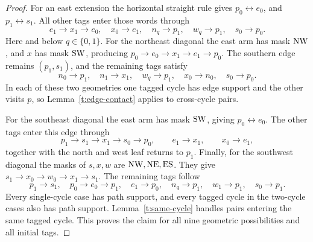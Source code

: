 \begin{proof}
For an east extension the horizontal straight rule gives
\(p_0\leftrightarrow e_0\), and \(p_1\leftrightarrow s_1\).
All other tags enter those words through
\[
e_1\to x_1\to e_0,\quad x_0\to e_1,\quad
n_q\to p_1,\quad w_q\to p_1,\quad s_0\to p_0.
\]
Here and below \(q\in\{0,1\}\). For the northeast diagonal the east arm
has mask \(\mathrm{N}\mathrm{W}\), and \(x\) has mask \(\mathrm{S}\mathrm{W}\), producing
\(p_0\to e_0\to x_1\to e_1\to p_0\). The southern edge remains
\((p_1,s_1)\), and the remaining tags satisfy
\[
n_0\to p_1,\quad n_1\to x_1,\quad w_q\to p_1,
\quad x_0\to n_0,\quad s_0\to p_0.
\]
In each of these two geometries one tagged cycle has edge support and the
other visits \(p\), so Lemma~\ref{t:edge-contact} applies to cross-cycle
pairs.

For the southeast diagonal the east arm has mask \(\mathrm{S}\mathrm{W}\), giving
\(p_0\leftrightarrow e_0\). The other tags enter this edge through
\[
p_1\to s_1\to x_1\to s_0\to p_0,
\qquad e_1\to x_1,\qquad x_0\to e_1,
\]
together with the north and west leaf returns to \(p_1\). Finally, for the
southwest diagonal the masks of \(s,x,w\) are
\(\mathrm{N}\mathrm{W},\mathrm{N}\mathrm{E},\mathrm{E}\mathrm{S}\). They give
\(s_1\to x_0\to w_0\to x_1\to s_1\). The remaining tags follow
\[
p_1\to s_1,\quad p_0\to e_0\to p_1,\quad e_1\to p_0,
\quad n_q\to p_1,\quad w_1\to p_1,\quad s_0\to p_1.
\]
Every single-cycle case has path support, and every tagged cycle in the
two-cycle cases also has path support. Lemma~\ref{t:same-cycle} handles
pairs entering the same tagged cycle. This proves the claim for all nine
geometric possibilities and all initial tags.
\end{proof}

